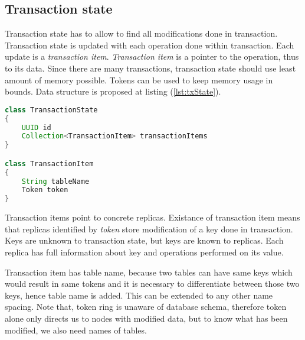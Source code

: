 \subsection{Transaction state}
Transaction state has to allow to find all modifications done in transaction. Transaction state is updated with each operation done within transaction. Each update is a \emph{transaction item}. \emph{Transaction item} is a pointer to the operation, thus to its data. Since there are many transactions, transaction state should use least amount of memory possible. Tokens can be used to keep memory usage in bounds. Data structure is proposed at listing (\ref{lst:txState}).

\begin{lstlisting}[language=Java,style=outcode,label={lst:txState},caption={Transaction State data structure}]
class TransactionState
{
    UUID id
    Collection<TransactionItem> transactionItems    
}

class TransactionItem
{
    String tableName
    Token token
}
\end{lstlisting}






Transaction items point to concrete replicas. Existance of transaction item means that replicas identified by \emph{token} store modification of a key done in transaction. Keys are unknown to transaction state, but keys are known to replicas. Each replica has full information about key and operations performed on its value. 

Transaction item has table name, because two tables can have same keys which would result in same tokens and it is necessary to differentiate between those two keys, hence table name is added. This can be extended to any other name spacing. Note that, token ring is unaware of database schema, therefore token alone only directs us to nodes with modified data, but to know what has been modified, we also need names of tables.

